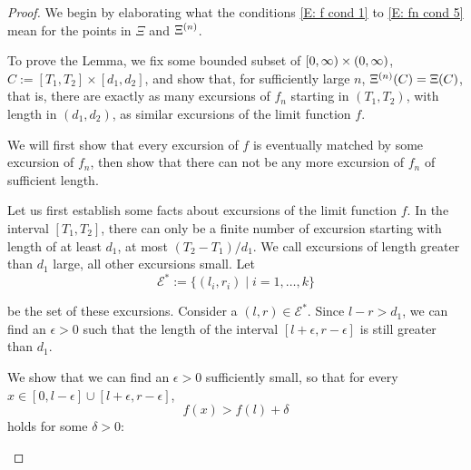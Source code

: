 \begin{proof}
We begin by elaborating what the conditions
\eqref{E: f cond 1} to \eqref{E: fn cond 5}
mean for the points in
$\Xi$ and $\Xi^{(n)}$.

To prove the Lemma, 
we fix some bounded subset of
$[0, \infty) \times (0, \infty)$,
$C := [T_1, T_2] \times [d_1, d_2]$,
and show that, for sufficiently large $n$,
$\Xi^{(n)}(C) = \Xi(C)$,
that is,
there are exactly as many excursions of $f_n$ starting in
$(T_1, T_2)$, 
with length in $(d_1, d_2)$,
as similar excursions of the limit function $f$.

We will first show that every excursion of $f$ is eventually matched by some excursion of $f_n$,
then show that there can not be any more excursion of $f_n$ of sufficient length.


\begin{proofpart} \label{PP: Lemma Det 1}
Let us first establish some facts about excursions of the limit function $f$.
In the interval $[T_1, T_2]$,
there can only be a finite number of excursion starting with length of at least $d_1$,
at most $(T_2 - T_1)/d_1$.
We call excursions of length greater than $d_1$ large, all other excursions small.
Let
\begin{equation}
\mathcal{E}^* := \{ (l_i, r_i) \; | \; i=1, \dots, k \}	
\end{equation}

be the set of these excursions.
Consider a
$(l,r) \in \mathcal{E}^*$.
Since $l-r > d_1$,
we can find an $\epsilon > 0$
such that the length of the interval
$[l+\epsilon, r-\epsilon]$
is still greater than $d_1$.

We show that we can find an $\epsilon > 0$ sufficiently small,
so that for every
$x \in [0, l-\epsilon] \cup [l+\epsilon, r-\epsilon]$,
\begin{equation} \label{E: fx > fl + delta}
f(x) > f(l) + \delta
\end{equation}
holds for some $\delta > 0$:


\end{proofpart}
\end{proof}
